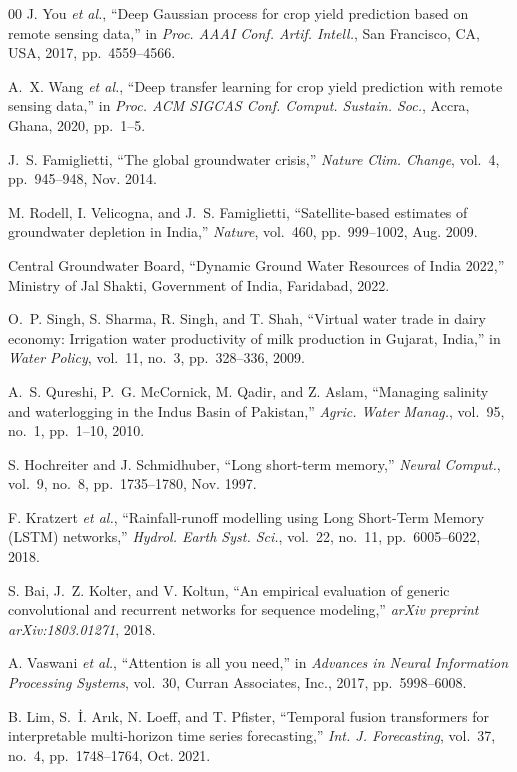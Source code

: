 \documentclass{ieeeaccess}
\begin{document}
\begin{thebibliography}{00}
J. You \textit{et al.}, ``Deep Gaussian process for crop yield prediction based on remote sensing data,'' in \textit{Proc. AAAI Conf. Artif. Intell.}, San Francisco, CA, USA, 2017, pp.~4559--4566.

A.~X. Wang \textit{et al.}, ``Deep transfer learning for crop yield prediction with remote sensing data,'' in \textit{Proc. ACM SIGCAS Conf. Comput. Sustain. Soc.}, Accra, Ghana, 2020, pp.~1--5.

J.~S. Famiglietti, ``The global groundwater crisis,'' \textit{Nature Clim. Change}, vol.~4, pp.~945--948, Nov. 2014.

M. Rodell, I. Velicogna, and J.~S. Famiglietti, ``Satellite-based estimates of groundwater depletion in India,'' \textit{Nature}, vol.~460, pp.~999--1002, Aug. 2009.

Central Groundwater Board, ``Dynamic Ground Water Resources of India 2022,'' Ministry of Jal Shakti, Government of India, Faridabad, 2022.

O.~P. Singh, S. Sharma, R. Singh, and T. Shah, ``Virtual water trade in dairy economy: Irrigation water productivity of milk production in Gujarat, India,'' in \textit{Water Policy}, vol.~11, no.~3, pp.~328--336, 2009.

A.~S. Qureshi, P.~G. McCornick, M. Qadir, and Z. Aslam, ``Managing salinity and waterlogging in the Indus Basin of Pakistan,'' \textit{Agric. Water Manag.}, vol.~95, no.~1, pp.~1--10, 2010.

S. Hochreiter and J. Schmidhuber, ``Long short-term memory,'' \textit{Neural Comput.}, vol.~9, no.~8, pp.~1735--1780, Nov. 1997.

F. Kratzert \textit{et al.}, ``Rainfall-runoff modelling using Long Short-Term Memory (LSTM) networks,'' \textit{Hydrol. Earth Syst. Sci.}, vol.~22, no.~11, pp.~6005--6022, 2018.

S. Bai, J.~Z. Kolter, and V. Koltun, ``An empirical evaluation of generic convolutional and recurrent networks for sequence modeling,'' \textit{arXiv preprint arXiv:1803.01271}, 2018.

A. Vaswani \textit{et al.}, ``Attention is all you need,'' in \textit{Advances in Neural Information Processing Systems}, vol.~30, Curran Associates, Inc., 2017, pp.~5998--6008.

B. Lim, S.~\.{I}. Ar{\i}k, N. Loeff, and T. Pfister, ``Temporal fusion transformers for interpretable multi-horizon time series forecasting,'' \textit{Int. J. Forecasting}, vol.~37, no.~4, pp.~1748--1764, Oct. 2021.


\end{thebibliography}
\end{document}
